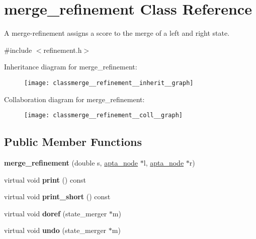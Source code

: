 \hypertarget{classmerge__refinement}{}\section{merge\+\_\+refinement Class Reference}
\label{classmerge__refinement}


A merge-\/refinement assigns a score to the merge of a left and right state.  




{\ttfamily \#include $<$refinement.\+h$>$}



Inheritance diagram for merge\+\_\+refinement\+:\nopagebreak
\begin{figure}[H]
\begin{center}
\leavevmode
\texttt{[image: classmerge\_\_refinement\_\_inherit\_\_graph]}
\end{center}
\end{figure}


Collaboration diagram for merge\+\_\+refinement\+:\nopagebreak
\begin{figure}[H]
\begin{center}
\leavevmode
\texttt{[image: classmerge\_\_refinement\_\_coll\_\_graph]}
\end{center}
\end{figure}
\subsection*{Public Member Functions}
\begin{DoxyCompactItemize}
\item 
{\bfseries merge\+\_\+refinement} (double s, \hyperlink{classapta__node}{apta\+\_\+node} $\ast$l, \hyperlink{classapta__node}{apta\+\_\+node} $\ast$r)\hypertarget{classmerge__refinement_ab15fbbafe3f8f46af3642854c8369358}{}\label{classmerge__refinement_ab15fbbafe3f8f46af3642854c8369358}

\item 
virtual void {\bfseries print} () const \hypertarget{classmerge__refinement_ab2cefa02adc51cdb87a05e9d78b0c54a}{}\label{classmerge__refinement_ab2cefa02adc51cdb87a05e9d78b0c54a}

\item 
virtual void {\bfseries print\+\_\+short} () const \hypertarget{classmerge__refinement_a0c6074a732d5656f1fd87432c7c2b1de}{}\label{classmerge__refinement_a0c6074a732d5656f1fd87432c7c2b1de}

\item 
virtual void {\bfseries doref} (state\+\_\+merger $\ast$m)\hypertarget{classmerge__refinement_ad1b3a5fe3fa980978d909debf4eaebd1}{}\label{classmerge__refinement_ad1b3a5fe3fa980978d909debf4eaebd1}

\item 
virtual void {\bfseries undo} (state\+\_\+merger $\ast$m)\hypertarget{classmerge__refinement_ae5d7dcbd7ddc8595b2d7bcf88d14ad98}{}\label{classmerge__refinement_ae5d7dcbd7ddc8595b2d7bcf88d14ad98}

\end{DoxyCompactItemize}

